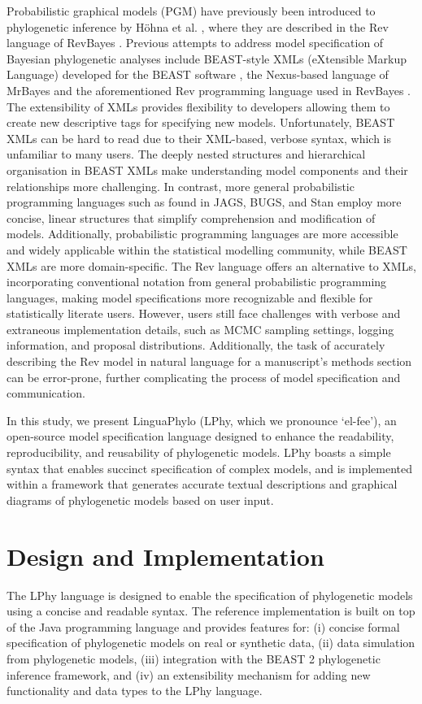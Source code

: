 \documentclass[10pt,letterpaper,table]{article}
\theoremstyle{definition}
\begin{document}
Probabilistic graphical models (PGM) have previously been introduced to phylogenetic inference by H\"{o}hna et al. \cite{revbayes}, where they are described in the Rev language of RevBayes \cite{revbayes}. 
Previous attempts to address model specification of Bayesian phylogenetic analyses include BEAST-style XMLs (eXtensible Markup Language) developed for the BEAST software \cite{beast,beast2}, the Nexus-based language of MrBayes \cite{mrbayes} and the aforementioned Rev programming language used in RevBayes \cite{revbayes}.
The extensibility of XMLs provides flexibility to developers allowing them to create new descriptive tags for specifying new models.
Unfortunately, BEAST XMLs can be hard to read due to their XML-based, verbose syntax, which is unfamiliar to many users. The deeply nested structures and hierarchical organisation in BEAST XMLs make understanding model components and their relationships more challenging. In contrast, more general probabilistic programming languages such as found in JAGS, BUGS, and Stan employ more concise, linear structures that simplify comprehension and modification of models. Additionally, probabilistic programming languages are more accessible and widely applicable within the statistical modelling community, while BEAST XMLs are more domain-specific. 
The Rev language \cite{revbayes} offers an alternative to XMLs, incorporating conventional notation from general probabilistic programming languages, making model specifications more recognizable and flexible for statistically literate users. 
However, users still face challenges with verbose and extraneous implementation details, such as MCMC sampling settings, logging information, and proposal distributions. 
Additionally, the task of accurately describing the Rev model in natural language for a manuscript's methods section can be error-prone, further complicating the process of model specification and communication.

In this study, we present LinguaPhylo (LPhy, which we pronounce `el-fee'), an open-source model specification language designed to enhance the readability, reproducibility, and reusability of phylogenetic models. LPhy boasts a simple syntax that enables succinct specification of complex models, and is implemented within a framework that generates accurate textual descriptions and graphical diagrams of phylogenetic models based on user input.

\section{Design and Implementation}
The LPhy language is designed to enable the specification of phylogenetic models using a concise and readable syntax.  
The reference implementation is built on top of the Java programming language and provides features for: 
(i) concise formal specification of phylogenetic models on real or synthetic data, (ii) data simulation from phylogenetic models, (iii) integration with the BEAST 2 phylogenetic inference framework, and (iv) an extensibility mechanism for adding new functionality and data types to the LPhy language.
\end{document}
